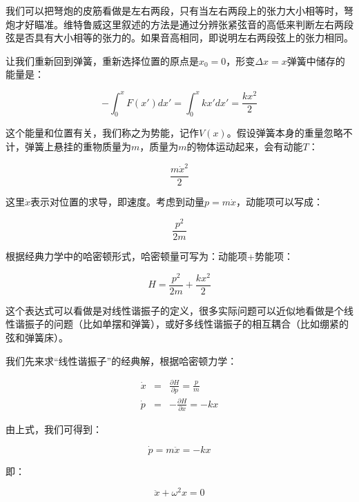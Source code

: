 我们可以把弩炮的皮筋看做是左右两段，只有当左右两段上的张力大小相等时，弩炮才好瞄准。维特鲁威这里叙述的方法是通过分辨张紧弦音的高低来判断左右两段弦是否具有大小相等的张力的。如果音高相同，即说明左右两段弦上的张力相同。

让我们重新回到弹簧，重新选择位置的原点是$x_0 = 0$，形变$\Delta x = x$弹簧中储存的能量是：

\begin{equation}
- \int_0^x F(x')d x' = \int_0^x k x' d x' = \frac{k x^2}{2} 
\end{equation}

这个能量和位置有关，我们称之为势能，记作$V(x)$。假设弹簧本身的重量忽略不计，弹簧上悬挂的重物质量为$m$，质量为$m$的物体运动起来，会有动能$T$：

\begin{equation}
\frac{m {\dot x}^2}{2}
\end{equation}

这里$\dot x$表示对位置的求导，即速度。考虑到动量$p = m \dot x$，动能项可以写成：

\begin{equation}
\frac{p^2}{2m}
\end{equation}

根据经典力学中的哈密顿形式，哈密顿量可写为：动能项+势能项：

\begin{equation}
H = \frac{p^2}{2m} + \frac{kx^2}{2}
\end{equation}

这个表达式可以看做是对线性谐振子的定义，很多实际问题可以近似地看做是个线性谐振子的问题（比如单摆和弹簧），或好多线性谐振子的相互耦合（比如绷紧的弦和弹簧床）。

我们先来求“线性谐振子”的经典解，根据哈密顿力学：

\begin{eqnarray}
\dot x &=& \frac{\partial H}{\partial p} = \frac{p}{m}\\
\dot p &=& - \frac{\partial H}{\partial x} = - kx
\end{eqnarray}

由上式，我们可得到：

\begin{equation*}
\dot p = m \ddot x = - k x
\end{equation*}

即：

\begin{equation}
\ddot x + \omega^2 x = 0
\end{equation}

